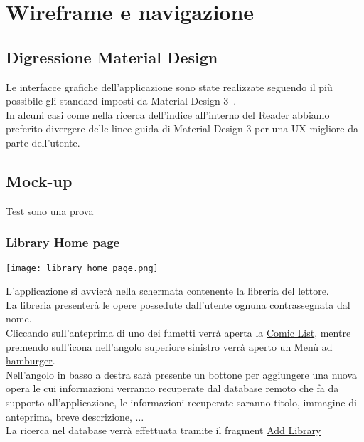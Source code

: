 \documentclass[../Assignment-3-LPSMT.tex]{subfiles}
\begin{document}
\chapter{Wireframe e navigazione}

\section{Digressione Material Design}

Le interfacce grafiche dell'applicazione sono state realizzate seguendo il più possibile gli standard imposti da Material Design 3~\cite{matDes}.\\
In alcuni casi come nella ricerca dell'indice all'interno del \hyperref[sec:reader]{Reader} abbiamo preferito divergere delle linee guida di Material Design 3 per una UX migliore da parte dell'utente.

\section{Mock-up}

Test sono una prova

\subsection{Library \- Home page}\label{sec:home}

\begin{center}
   \texttt{[image: library\_home\_page.png]}
\end{center}

L'applicazione si avvierà nella schermata contenente la libreria del lettore.\\
La libreria presenterà le opere possedute dall'utente ognuna contrassegnata dal nome.\\
Cliccando sull'anteprima di uno dei fumetti verrà aperta la \hyperref[sec:comic_list]{Comic List}, mentre premendo sull'icona nell'angolo superiore sinistro verrà aperto un \hyperref[sec:hamburger]{Menù ad hamburger}.\\
Nell'angolo in basso a destra sarà presente un bottone per aggiungere una nuova opera le cui informazioni verranno recuperate dal database remoto che fa da supporto all'applicazione, le informazioni recuperate saranno titolo, immagine di anteprima, breve descrizione, $\dots$\\
La ricerca nel database verrà effettuata tramite il fragment \hyperref[sec:add_library]{Add Library}
\end{document}
